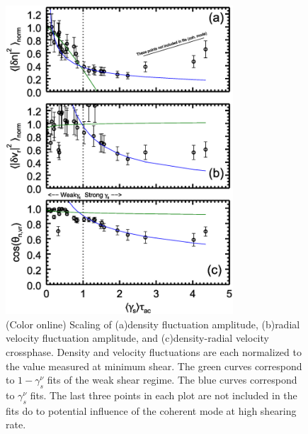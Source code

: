 \documentclass[aip,pop,amsmath,amssymb,peprint,superscriptaddress]{revtex4-1} %
\begin{document}
\begin{figure}[!htbp]
\centerline{
\includegraphics[width=8.5cm]{figure2.eps}}
\caption{\label{fig:densvrcp} (Color online) Scaling of (a)density fluctuation amplitude, (b)radial velocity fluctuation amplitude, and (c)density-radial velocity crossphase. Density and velocity fluctuations are each normalized to the value measured at minimum shear. The green curves correspond to $1-\gamma_{s}^{\nu}$ fits of the weak shear regime. The blue curves correspond to $\gamma_{s}^{\nu}$ fits. The last three points in each plot are not included in the fits do to potential influence of the coherent mode at high shearing rate.}
\end{figure}
\end{document}
